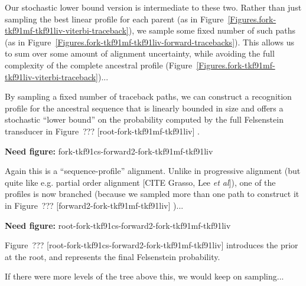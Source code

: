 \documentclass{article}
\newcommand{\figref}[1]{Figure~\ref{Figures.#1}}
\newcommand{\needfig}[1]{{\bf Need figure: } #1 }
\newcommand{\needfigref}[1]{Figure~??? [#1] }
\newcommand{\needcite}[1]{[CITE #1]}
\begin{document}
Our stochastic lower bound version is intermediate to these two.
Rather than just sampling the best linear profile for each parent
(as in \figref{fork-tkf91mf-tkf91liv-viterbi-traceback}),
we sample some fixed number of such paths
(as in \figref{fork-tkf91mf-tkf91liv-forward-tracebacks}).
This allows us to sum over some amount of alignment uncertainty,
while avoiding the full complexity of the complete ancestral profile
(\figref{fork-tkf91mf-tkf91liv-viterbi-traceback})...

By sampling a fixed number of traceback paths,
we can construct a recognition profile for the ancestral sequence
that is linearly bounded in size and offers a stochastic ``lower bound''
on the probability computed by the full Felsenstein transducer in \needfigref{root-fork-tkf91mf-tkf91liv}.

\needfig{fork-tkf91cs-forward2-fork-tkf91mf-tkf91liv}

Again this is a ``sequence-profile'' alignment.
Unlike in progressive alignment
 (but quite like e.g. partial order alignment \needcite{Grasso, Lee {\em et al}}),
one of the profiles is now branched
 (because we sampled more than one path to construct it in \needfigref{forward2-fork-tkf91mf-tkf91liv})...

\needfig{root-fork-tkf91cs-forward2-fork-tkf91mf-tkf91liv}

\needfigref{root-fork-tkf91cs-forward2-fork-tkf91mf-tkf91liv}
introduces the prior at the root, and represents the final Felsenstein probability.

If there were more levels of the tree above this, we would keep on sampling...
\end{document}
